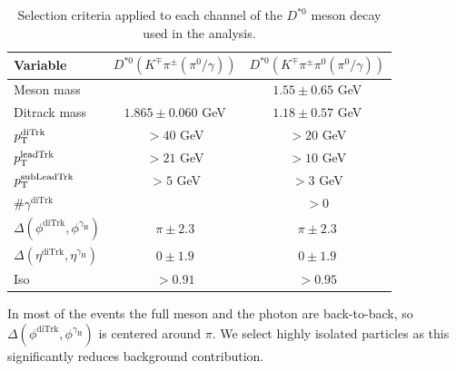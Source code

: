 \begin{table}[!ht]
    \centering
    \begin{tabular}{|l|c|c|}
        \hline
        \cellcolor{lightgray}Variable & \cellcolor{lightgray}$D^{*0}(K^{\mp}\pi^{\pm}{\scriptstyle(\pi^{0}/\gamma)})$ & \cellcolor{lightgray}$D^{*0}(K^{\mp}\pi^{\pm}\pi^{0}{\scriptstyle(\pi^{0}/\gamma)})$ \\ \hline
        Meson mass                                              &                   &$1.55\pm 0.65$ GeV  \\
        Ditrack mass                                            &$1.865\pm0.060$ GeV&$1.18\pm 0.57$ GeV  \\
        $p_\text{T}^{\text{diTrk}}$                                    &$>40$ GeV          &$>20$ GeV           \\
        $p_\text{T}^{\text{leadTrk}}$                                  &$>21$ GeV          &$>10$ GeV           \\
        $p_\text{T}^{\text{subLeadTrk}}$                               &$>5$ GeV           &$>3$ GeV           \\
        $\#\gamma^{\text{diTrk}}$                               &                   &$>0$               \\
        $\Delta(\phi^{\text{diTrk}}, \phi^{\gamma_\text{H}})$   &$\pi\pm2.3$        &$\pi\pm2.3$        \\
        $\Delta(\eta^{\text{diTrk}}, \eta^{\gamma_\text{H}})$   &$0\pm1.9$          &$0\pm1.9$           \\
        Iso                                                     &$>0.91$            &$>0.95$             \\
        \hline
        \end{tabular}
    \caption{Selection criteria applied to each channel of the $D^{*0}$ meson decay used in the analysis.}
    \label{tab:meson_selection_2}
\end{table}

In most of the events the full meson and the photon are back-to-back, so $\Delta(\phi^{\text{diTrk}}, \phi^{\gamma_\text{H}})$ is centered around $\pi$. We select highly isolated particles as this significantly reduces background contribution.


